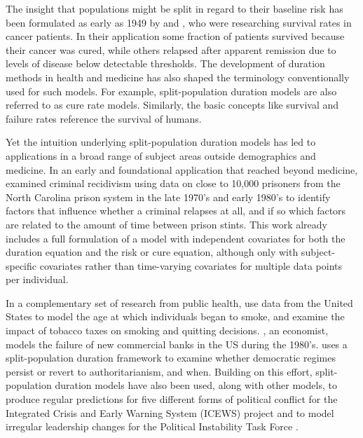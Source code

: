 \documentclass[article]{jss}
\begin{document}
The insight that populations might be split in regard to their baseline
risk has been formulated as early as 1949 by \citet{boag1949maximum} and \citet{berkson1952survival}, who were researching survival rates in cancer patients. In
their application some fraction of patients survived because their
cancer was cured, while others relapsed after apparent remission due to
levels of disease below detectable thresholds. The development of
duration methods in health and medicine has also shaped the terminology
conventionally used for such models. For example, split-population
duration models are also referred to as cure rate models. Similarly, the
basic concepts like survival and failure rates reference the survival of
humans.

Yet the intuition underlying split-population duration models has led to
applications in a broad range of subject areas outside demographics and
medicine. In an early and foundational application that reached beyond
medicine, \citet{schmidt1989predicting} examined criminal recidivism using
data on close to 10,000 prisoners from the North Carolina prison system
in the late 1970's and early 1980's to identify factors that influence
whether a criminal relapses at all, and if so which factors are related
to the amount of time between prison stints. This work already includes
a full formulation of a model with independent covariates for both the
duration equation and the risk or cure equation, although only with
subject-specific covariates rather than time-varying covariates for
multiple data points per individual.

In a complementary set of research from public health, \citet{douglas1994hazard} use data from the United States to model the age at
which individuals began to smoke, and \citet{forster2001role} examine
the impact of tobacco taxes on smoking and quitting decisions. \citet{deyoung2003failure}, an economist, models the failure of new commercial banks in the
US during the 1980's. \citet{svolik2008authoritarian} uses a split-population duration
framework to examine whether democratic regimes persist or revert to
authoritarianism, and when. Building on this effort, split-population
duration models have also been used, along with other models, to produce
regular predictions for five different forms of political conflict for
the Integrated Crisis and Early Warning System (ICEWS) project \citep{ward2013learning} and to model irregular leadership changes for the Political
Instability Task Force \citep[PITF;][]{beger2014ensemble}.
\end{document}
